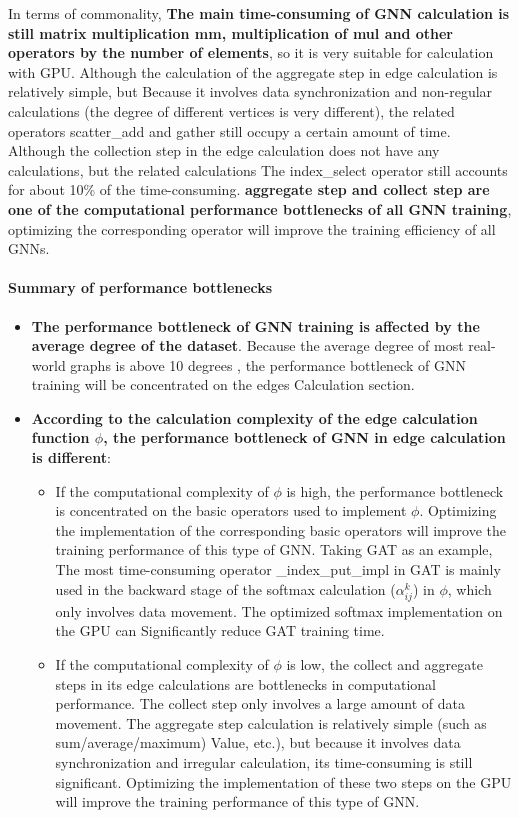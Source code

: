 In terms of commonality, 
\textbf{The main time-consuming of GNN calculation is still matrix multiplication mm, multiplication of mul and other operators by the number of elements},
so it is very suitable for calculation with GPU. Although the calculation of the aggregate step in edge calculation is relatively simple,
but Because it involves data synchronization and non-regular calculations (the degree of different vertices is very different),
the related operators scatter\_add and gather still occupy a certain amount of time.
Although the collection step in the edge calculation does not have any calculations,
but the related calculations The index\_select operator still accounts for about 10\% of the time-consuming.
\textbf{aggregate step and collect step are one of the computational performance bottlenecks of all GNN training},
optimizing the corresponding operator will improve the training efficiency of all GNNs.

\paragraph{Summary of performance bottlenecks}

\begin{itemize}
    \item \textbf{The performance bottleneck of GNN training is affected by the average degree of the dataset}. 
    Because the average degree of most real-world graphs is above 10 degrees \cite{network-repository}, 
    the performance bottleneck of GNN training will be concentrated on the edges Calculation section.
    \item \textbf{According to the calculation complexity of the edge calculation function $\phi$, the performance bottleneck of GNN in edge calculation is different}:
    \begin{itemize}
        \item If the computational complexity of $\phi$ is high, the performance bottleneck is concentrated on the basic operators used to implement $\phi$.
        Optimizing the implementation of the corresponding basic operators will improve the training performance of this type of GNN.
        Taking GAT as an example, The most time-consuming operator \_index\_put\_impl in GAT is mainly used in the backward stage of the softmax calculation ($\alpha^k_{ij}$) in $\phi$,
        which only involves data movement.
        The optimized softmax implementation on the GPU can Significantly reduce GAT training time.
        \item If the computational complexity of $\phi$ is low, the collect and aggregate steps in its edge calculations are bottlenecks in computational performance. The collect step only involves a large amount of data movement. The aggregate step calculation is relatively simple (such as sum/average/maximum) Value, etc.), but because it involves data synchronization and irregular calculation, its time-consuming is still significant.
         Optimizing the implementation of these two steps on the GPU will improve the training performance of this type of GNN.
    \end{itemize}
\end{itemize}


